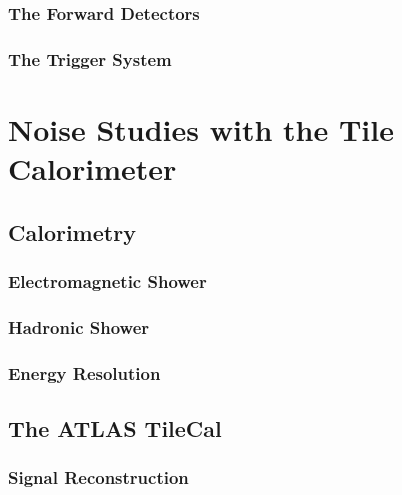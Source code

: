 \documentclass[10pt,twoside,cucitura,classica,english,openany]{toptesi}
\begin{document}
\subsection{The Forward Detectors}
\label{sec:forward-detectors}



\subsection{The Trigger System}
\label{sec:trigger-system}



\chapter{Noise Studies with the Tile Calorimeter}
\label{cha:noise-studies-with}

\section{Calorimetry}
\label{sec:calorimetry}



\subsection{Electromagnetic Shower}
\label{sec:electr-show}



\subsection{Hadronic Shower}
\label{sec:hadronic-shower}



\subsection{Energy Resolution}
\label{sec:energy-resolution}



\section{The ATLAS TileCal}
\label{sec:atlas-tilecal}



\subsection{Signal Reconstruction}
\label{sec:sign-reconstr}
\end{document}
